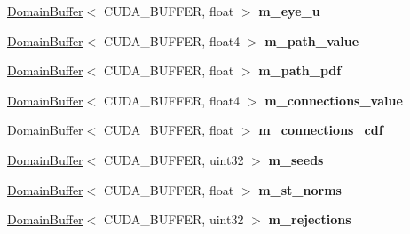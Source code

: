 \begin{DoxyCompactItemize}
\mbox{\label{struct_p_s_s_m_l_t_a2539a504b8cd59165271d9ce1feea2c2}} 
\hyperlink{class_domain_buffer}{Domain\+Buffer}$<$ C\+U\+D\+A\+\_\+\+B\+U\+F\+F\+ER, float $>$ {\bfseries m\+\_\+eye\+\_\+u}
\item 
\mbox{\label{struct_p_s_s_m_l_t_a7acc90c211c2029cc70373dbef2b4b1b}} 
\hyperlink{class_domain_buffer}{Domain\+Buffer}$<$ C\+U\+D\+A\+\_\+\+B\+U\+F\+F\+ER, float4 $>$ {\bfseries m\+\_\+path\+\_\+value}
\item 
\mbox{\label{struct_p_s_s_m_l_t_a99a99191aa83c7f2c1710e5f1e586d3f}} 
\hyperlink{class_domain_buffer}{Domain\+Buffer}$<$ C\+U\+D\+A\+\_\+\+B\+U\+F\+F\+ER, float $>$ {\bfseries m\+\_\+path\+\_\+pdf}
\item 
\mbox{\label{struct_p_s_s_m_l_t_abee77399e02e5ce1fa6cb97127b9068f}} 
\hyperlink{class_domain_buffer}{Domain\+Buffer}$<$ C\+U\+D\+A\+\_\+\+B\+U\+F\+F\+ER, float4 $>$ {\bfseries m\+\_\+connections\+\_\+value}
\item 
\mbox{\label{struct_p_s_s_m_l_t_ae0a9cd88765ba6cd70fb7344f40472a5}} 
\hyperlink{class_domain_buffer}{Domain\+Buffer}$<$ C\+U\+D\+A\+\_\+\+B\+U\+F\+F\+ER, float $>$ {\bfseries m\+\_\+connections\+\_\+cdf}
\item 
\mbox{\label{struct_p_s_s_m_l_t_a280aa1330dddc10413d16dc5b955e3f2}} 
\hyperlink{class_domain_buffer}{Domain\+Buffer}$<$ C\+U\+D\+A\+\_\+\+B\+U\+F\+F\+ER, uint32 $>$ {\bfseries m\+\_\+seeds}
\item 
\mbox{\label{struct_p_s_s_m_l_t_ab9229f332f5db89f64cf9238c4a65501}} 
\hyperlink{class_domain_buffer}{Domain\+Buffer}$<$ C\+U\+D\+A\+\_\+\+B\+U\+F\+F\+ER, float $>$ {\bfseries m\+\_\+st\+\_\+norms}
\item 
\mbox{\label{struct_p_s_s_m_l_t_a43befefe9bc5b8476ca13db2445d9f32}} 
\hyperlink{class_domain_buffer}{Domain\+Buffer}$<$ C\+U\+D\+A\+\_\+\+B\+U\+F\+F\+ER, uint32 $>$ {\bfseries m\+\_\+rejections}
\item 
\mbox{\label{struct_p_s_s_m_l_t_aac5f5435d2f3984e23c0a6e52997f44b}} 

\end{DoxyCompactItemize}
